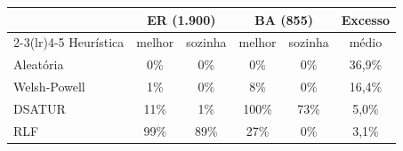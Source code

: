 \begin{tabular}{@{}lccccc@{}}
\toprule
 & \multicolumn{2}{c}{ER (1.900)} & \multicolumn{2}{c}{BA (855)} & Excesso \\
\cmidrule(lr){2-3}\cmidrule(lr){4-5}
Heurística & melhor & sozinha & melhor & sozinha & médio \\
\midrule
Aleatória & 0\% & 0\% & 0\% & 0\% & 36{,}9\% \\
Welsh-Powell & 1\% & 0\% & 8\% & 0\% & 16{,}4\% \\
DSATUR & 11\% & 1\% & 100\% & 73\% & 5{,}0\% \\
RLF & 99\% & 89\% & 27\% & 0\% & 3{,}1\% \\
\bottomrule
\end{tabular}
